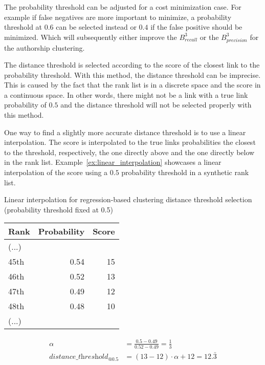The probability threshold can be adjusted for a cost minimization case.
For example if false negatives are more important to minimize, a probability threshold at $0.6$ can be selected instead or $0.4$ if the false positive should be minimized.
Which will subsequently either improve the $B^3_{recall}$ or the $B^3_{precision}$ for the authorship clustering.

The distance threshold is selected according to the score of the closest link to the probability threshold.
With this method, the distance threshold can be imprecise.
This is caused by the fact that the rank list is in a discrete space and the score in a continuous space.
In other words, there might not be a link with a true link probability of $0.5$ and the distance threshold will not be selected properly with this method.

One way to find a slightly more accurate distance threshold is to use a linear interpolation.
The score is interpolated to the true links probabilities the closest to the threshold, respectively, the one directly above and the one directly below in the rank list.
Example~\ref{ex:linear_interpolation} showcases a linear interpolation of the score using a $0.5$ probability threshold in a synthetic rank list.

\begin{example}
  \centering
  \caption{Linear interpolation for regression-based clustering distance threshold selection (probability threshold fixed at 0.5)}
  \label{ex:linear_interpolation}

  \begin{subexample}{\linewidth}
    \centering
    \begin{tabular}{l r r}
      \toprule
      Rank & Probability & Score \\
      \midrule
      (...) & &\\
      45th & 0.54 & 15 \\
      46th & 0.52 & 13 \\
      47th & 0.49 & 12 \\
      48th & 0.48 & 10 \\
      (...) & & \\
      \bottomrule
    \end{tabular}
  \end{subexample}

  \vspace{0.5cm}

  \begin{subexample}{\linewidth}
    \centering
    \begin{align*}
        \alpha &= \frac{0.5 - 0.49}{0.52 - 0.49} = \frac{1}{3} \\
        \textit{distance\_threshold}_{@0.5} &= (13 - 12) \cdot \alpha + 12 = 12.\bar{3}
    \end{align*}
  \end{subexample}
\end{example}



